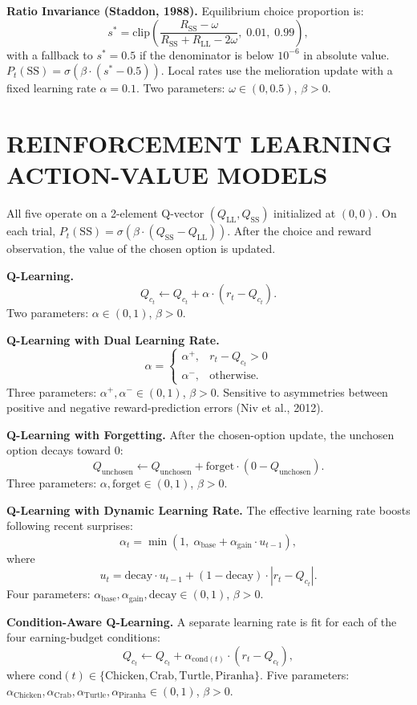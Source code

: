 \documentclass[12pt]{article}
\begin{document}
\textbf{Ratio Invariance (Staddon, 1988).} Equilibrium choice proportion is:
\[
s^{*} = \mathrm{clip}\!\left( \frac{R_{\mathrm{SS}} - \omega}{R_{\mathrm{SS}} + R_{\mathrm{LL}} - 2\omega},\; 0.01,\; 0.99 \right),
\]
with a fallback to $s^{*} = 0.5$ if the denominator is below $10^{-6}$ in absolute value. $P_t(\mathrm{SS}) = \sigma\!\left( \beta \cdot (s^{*} - 0.5) \right)$. Local rates use the melioration update with a fixed learning rate $\alpha = 0.1$. Two parameters: $\omega \in (0, 0.5)$, $\beta > 0$.

\section*{REINFORCEMENT LEARNING ACTION-VALUE MODELS}

\indent All five operate on a 2-element Q-vector $(Q_{\mathrm{LL}}, Q_{\mathrm{SS}})$ initialized at $(0, 0)$. On each trial, $P_t(\mathrm{SS}) = \sigma\!\left( \beta \cdot (Q_{\mathrm{SS}} - Q_{\mathrm{LL}}) \right)$. After the choice and reward observation, the value of the chosen option is updated.

\textbf{Q-Learning.}
\[
Q_{c_t} \leftarrow Q_{c_t} + \alpha \cdot (r_t - Q_{c_t}).
\]
Two parameters: $\alpha \in (0, 1)$, $\beta > 0$.

\textbf{Q-Learning with Dual Learning Rate.}
\[
\alpha =
\begin{cases}
\alpha^{+}, & r_t - Q_{c_t} > 0 \\
\alpha^{-}, & \text{otherwise.}
\end{cases}
\]
Three parameters: $\alpha^{+}, \alpha^{-} \in (0, 1)$, $\beta > 0$. Sensitive to asymmetries between positive and negative reward-prediction errors (Niv et al., 2012).

\textbf{Q-Learning with Forgetting.} After the chosen-option update, the unchosen option decays toward 0:
\[
Q_{\text{unchosen}} \leftarrow Q_{\text{unchosen}} + \mathrm{forget} \cdot (0 - Q_{\text{unchosen}}).
\]
Three parameters: $\alpha, \mathrm{forget} \in (0, 1)$, $\beta > 0$.

\textbf{Q-Learning with Dynamic Learning Rate.} The effective learning rate boosts following recent surprises:
\[
\alpha_t = \min\!\left(1,\; \alpha_{\text{base}} + \alpha_{\text{gain}} \cdot u_{t-1}\right),
\]
where
\[
u_t = \mathrm{decay} \cdot u_{t-1} + (1 - \mathrm{decay}) \cdot |r_t - Q_{c_t}|.
\]
Four parameters: $\alpha_{\text{base}}, \alpha_{\text{gain}}, \mathrm{decay} \in (0, 1)$, $\beta > 0$.

\textbf{Condition-Aware Q-Learning.} A separate learning rate is fit for each of the four earning-budget conditions:
\[
Q_{c_t} \leftarrow Q_{c_t} + \alpha_{\mathrm{cond}(t)} \cdot (r_t - Q_{c_t}),
\]
where $\mathrm{cond}(t) \in \{\mathrm{Chicken}, \mathrm{Crab}, \mathrm{Turtle}, \mathrm{Piranha}\}$. Five parameters: $\alpha_{\mathrm{Chicken}}, \alpha_{\mathrm{Crab}}, \alpha_{\mathrm{Turtle}}, \alpha_{\mathrm{Piranha}} \in (0, 1)$, $\beta > 0$.
\end{document}
